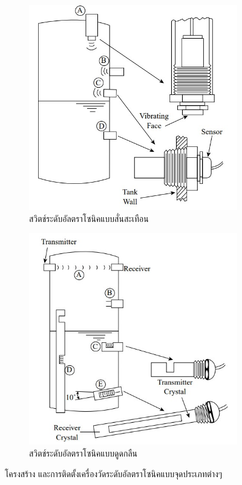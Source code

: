 \documentclass[final,11pt]{article}
\begin{document}
\begin{figure}[h]
    \begin{subfigure}[b]{0.5\textwidth}
        \centering
        \includegraphics[width=\textwidth]{images/Screenshot_16.jpg}
        \caption{สวิตช์ระดับอัลตราโซนิคแบบสั่นสะเทือน}
        \label{fig:uld1}
    \end{subfigure}
    \hfill
    \begin{subfigure}[b]{0.5\textwidth}
        \centering
        \includegraphics[width=\textwidth]{images/Screenshot_17.jpg}
        \caption{สวิตช์ระดับอัลตราโซนิคแบบดูดกลืน}
        \label{fig:uld2}
    \end{subfigure}
    \hfill
    \caption{โครงสร้าง และการติดตั้งเครื่องวัดระดับอัลตราโซนิคแบบจุดประเภทต่างๆ}
    \label{fig:uld}
\end{figure}
\end{document}
